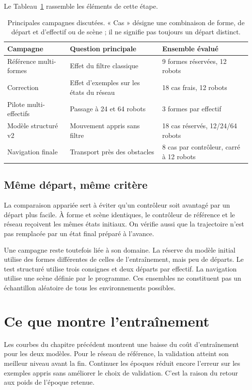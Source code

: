 Le Tableau~\ref{tab:experiences-1} rassemble les éléments de cette étape.
\begin{table}[htbp]
\caption{Principales campagnes discutées. « Cas » désigne une combinaison de forme, de départ et d'effectif ou de scène ; il ne signifie pas toujours un départ distinct.}
\label{tab:experiences-1}
\centering\small
\begin{tabularx}{\textwidth}{p{2.5cm}p{3.5cm}X}
\toprule
Campagne & Question principale & Ensemble évalué\\\midrule
Référence multi-formes & Effet du filtre classique & 9 formes réservées, 12 robots\\
Correction & Effet d'exemples sur les états du réseau & 18 cas frais, 12 robots\\
Pilote multi-effectifs & Passage à 24 et 64 robots & 3 formes par effectif\\
Modèle structuré v2 & Mouvement appris sans filtre & 18 cas réservés, 12/24/64 robots\\
Navigation finale & Transport près des obstacles & 8 cas par contrôleur, carré à 12 robots\\
\bottomrule
\end{tabularx}

\end{table}


\subsection{Même départ, même critère}
La comparaison appariée sert à éviter qu'un contrôleur soit avantagé par un départ plus facile. À forme et scène identiques, le contrôleur de référence et le réseau reçoivent les mêmes états initiaux. On vérifie aussi que la trajectoire n'est pas remplacée par un état final préparé à l'avance.

Une campagne reste toutefois liée à son domaine. La réserve du modèle initial utilise des formes différentes de celles de l'entraînement, mais peu de départs. Le test structuré utilise trois consignes et deux départs par effectif. La navigation utilise une scène définie par le programme. Ces ensembles ne constituent pas un échantillon aléatoire de tous les environnements possibles.

\section{Ce que montre l'entraînement}
Les courbes du chapitre précédent montrent une baisse du coût d'entraînement pour les deux modèles. Pour le réseau de référence, la validation atteint son meilleur niveau avant la fin. Continuer les époques réduit encore l'erreur sur les exemples appris sans améliorer le choix de validation. C'est la raison du retour aux poids de l'époque retenue.

